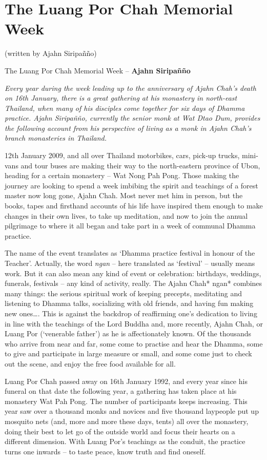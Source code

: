 
\chapter{The Luang Por Chah Memorial Week}

 (written by Ajahn Siripañño) 

The Luang Por Chah Memorial Week -- \textbf{Ajahn Siripañño}

\emph{Every year during the week leading up to the anniversary of Ajahn
Chah's death on 16th January, there is a great gathering at his
monastery in north-east Thailand, when many of his disciples come
together for six days of Dhamma practice. Ajahn Siripañño, currently the
senior monk at Wat Dtao Dum, provides the following account from his
perspective of living as a monk in Ajahn Chah's branch monasteries in
Thailand.}

12th January 2009, and all over Thailand motorbikes, cars, pick-up
trucks, mini-vans and tour buses are making their way to the
north-eastern province of Ubon, heading for a certain monastery -- Wat
Nong Pah Pong. Those making the journey are looking to spend a week
imbibing the spirit and teachings of a forest master now long gone, 
Ajahn Chah. Most never met him in person, but the books, tapes and
firsthand accounts of his life have inspired them enough to make changes
in their own lives, to take up meditation, and now to join the annual
pilgrimage to where it all began and take part in a week of communal
Dhamma practice. 

The name of the event translates as `Dhamma practice festival in honour
of the Teacher'. Actually, the word \emph{ngan} -- here translated as
`festival' -- usually means work. But it can also mean any kind of event
or celebration: birthdays, weddings, funerals, festivals -- any kind of
activity, really. The Ajahn Chah* ngan* combines many things: the
serious spiritual work of keeping precepts, meditating and listening to
Dhamma talks, socializing with old friends, and having fun making new
ones\ldots{}. This is against the backdrop of reaffirming one's
dedication to living in line with the teachings of the Lord Buddha and, 
more recently, Ajahn Chah, or Luang Por (`venerable father') as he is
affectionately known. Of the thousands who arrive from near and far, 
some come to practise and hear the Dhamma, some to give and participate
in large measure or small, and some come just to check out the scene, 
and enjoy the free food available for all. 

Luang Por Chah passed away on 16th January 1992, and every year since
his funeral on that date the following year, a gathering has taken place
at his monastery Wat Pah Pong. The number of participants keeps
increasing. This year saw over a thousand monks and novices and five
thousand laypeople put up mosquito nets (and, more and more these days, 
tents) all over the monastery, doing their best to let go of the outside
world and focus their hearts on a different dimension. With Luang Por's
teachings as the conduit, the practice turns one inwards -- to taste
peace, know truth and find oneself. 

